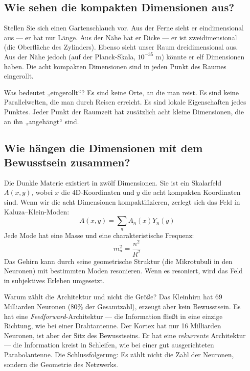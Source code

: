 \subsection{Wie sehen die kompakten Dimensionen aus?}
Stellen Sie sich einen Gartenschlauch vor. Aus der Ferne sieht er eindimensional aus --- er hat nur Länge. Aus der Nähe hat er Dicke --- er ist zweidimensional (die Oberfläche des Zylinders). Ebenso sieht unser Raum dreidimensional aus. Aus der Nähe jedoch (auf der Planck-Skala, $10^{-35}$ m) könnte er elf Dimensionen haben. Die acht kompakten Dimensionen sind in jeden Punkt des Raumes eingerollt.

Was bedeutet „eingerollt``? Es sind keine Orte, an die man reist. Es sind keine Parallelwelten, die man durch Reisen erreicht. Es sind lokale Eigenschaften jedes Punktes. Jeder Punkt der Raumzeit hat zusätzlich acht kleine Dimensionen, die an ihn „angehängt`` sind.

\subsection{Wie hängen die Dimensionen mit dem Bewusstsein zusammen?}
Die Dunkle Materie existiert in zwölf Dimensionen. Sie ist ein Skalarfeld $A(x,y)$, wobei $x$ die 4D-Koordinaten und $y$ die acht kompakten Koordinaten sind. Wenn wir die acht Dimensionen kompaktifizieren, zerlegt sich das Feld in Kaluza--Klein-Moden:
\begin{equation}
A(x,y) = \sum_n A_n(x) Y_n(y)
\end{equation}
Jede Mode hat eine Masse und eine charakteristische Frequenz:
\begin{equation}
m_n^2 = \frac{n^2}{R^2}
\end{equation}
Das Gehirn kann durch seine geometrische Struktur (die Mikrotubuli in den Neuronen) mit bestimmten Moden resonieren. Wenn es resoniert, wird das Feld in subjektives Erleben umgesetzt.

Warum zählt die Architektur und nicht die Größe? Das Kleinhirn hat 69 Milliarden Neuronen (80\% der Gesamtzahl), erzeugt aber kein Bewusstsein. Es hat eine \textit{Feedforward}-Architektur --- die Information fließt in eine einzige Richtung, wie bei einer Drahtantenne. Der Kortex hat nur 16 Milliarden Neuronen, ist aber der Sitz des Bewusstseins. Er hat eine \textit{rekurrente} Architektur --- die Information kreist in Schleifen, wie bei einer gut ausgerichteten Parabolantenne. Die Schlussfolgerung: Es zählt nicht die Zahl der Neuronen, sondern die Geometrie des Netzwerks.

